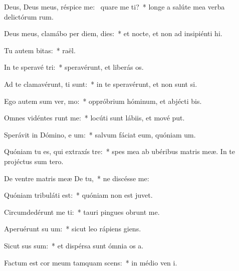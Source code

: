 \item Deus, Deus meus, réspice  me:~\pscross{} quare me ti?~* longe a salúte mea verba delictórum rum.
\item Deus meus, clamábo per diem,   dies:~* et nocte, et non ad insipiénti hi.
\item Tu autem   bitas:~*  raël.
\item In te speravé  tri:~* speravérunt, et liberás os.
\item Ad te clamavérunt,   ti sunt:~* in te speravérunt, et non sunt si.
\item Ego autem sum ver,   mo:~* oppróbrium hóminum, et abjécti bis.
\item Omnes vidéntes  runt me:~* locúti sunt lábiis, et mové put.
\item Sperávit in Dómino, e um:~* salvum fáciat eum, quóniam  um.
\item Quóniam tu es, qui extraxís   tre:~* spes mea ab ubéribus matris meæ. In te projéctus sum  tero.
\item De ventre matris meæ De   tu,~* ne discésse  me:
\item Quóniam tribuláti  est:~* quóniam non est  juvet.
\item Circumdedérunt me  ti:~* tauri pingues obrunt me.
\item Aperuérunt su   um:~* sicut leo rápiens  giens.
\item Sicut  sus sum:~* et dispérsa sunt ómnia os a.
\item Factum est cor meum tamquam  scens:~* in médio ven i.
